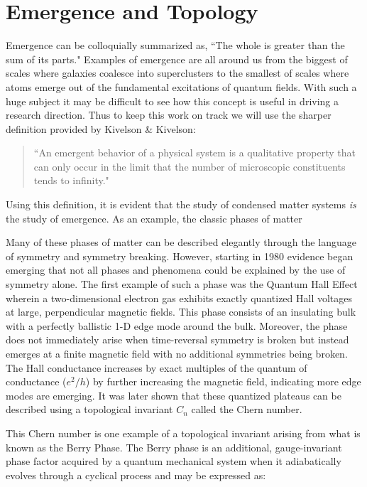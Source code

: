\section{Emergence and Topology}
Emergence can be colloquially summarized as, ``The whole is greater than the sum of its parts." Examples of emergence are all around us from the biggest of scales where galaxies coalesce into superclusters to the smallest of scales where atoms emerge out of the fundamental excitations of quantum fields. With such a huge subject it may be difficult to see how this concept is useful in driving a research direction. Thus to keep this work on track we will use the sharper definition provided by Kivelson \& Kivelson:
\begin{quote}
	``An emergent behavior of a physical system is a qualitative property that can only occur in the limit that the number of microscopic constituents tends to infinity."\cite{Kivelson2016}
\end{quote}
Using this definition, it is evident that the study of condensed matter systems \textit{is} the study of emergence. As an example, the classic phases of matter 
\par 
Many of these phases of matter can be described elegantly through the language of symmetry and symmetry breaking\cite{Noether1918, Landau1937, pathria_beale_2022}. However, starting in 1980 evidence began emerging that not all phases and phenomena could be explained by the use of symmetry alone. The first example of such a phase was the Quantum Hall Effect wherein a two-dimensional electron gas exhibits exactly quantized Hall voltages at large, perpendicular magnetic fields\cite{Klitzing1980}. This phase consists of an insulating bulk with a perfectly ballistic 1-D edge mode around the bulk. Moreover, the phase does not immediately arise when time-reversal symmetry is broken but instead emerges at a finite magnetic field with no additional symmetries being broken. The Hall conductance increases by exact multiples of the quantum of conductance ($e^{2}/h$) by further increasing the magnetic field, indicating more edge modes are emerging\cite{Zhang2005}. It was later shown that these quantized plateaus can be described using a topological invariant $C_{n}$ called the Chern number.\cite{Thouless1982, Kohmoto1985, Avron1983, Niu1985}\par 
This Chern number is one example of a topological invariant arising from what is known as the Berry Phase\cite{Berry1984}. The Berry phase is an additional, gauge-invariant phase factor acquired by a quantum mechanical system when it adiabatically evolves through a cyclical process and may be expressed as\cite{Berry1984, Xiao2010}:
